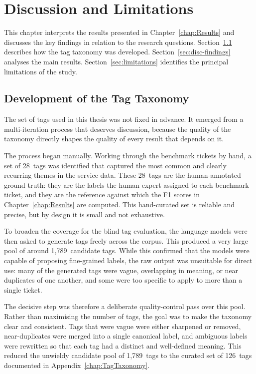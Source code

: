 \chapter{Discussion and Limitations}
%
\label{chap:Discussion}
%
This chapter interprets the results presented in Chapter~\ref{chap:Results}
and discusses the key findings in relation to the research questions.
Section~\ref{sec:disc-tags} describes how the tag taxonomy was developed.
Section~\ref{sec:disc-findings} analyses the main results.
Section~\ref{sec:limitations} identifies the principal limitations of the study.

\section{Development of the Tag Taxonomy}
\label{sec:disc-tags}
%
The set of tags used in this thesis was not fixed in advance.  It emerged from
a multi-iteration process that deserves discussion, because the quality of the
taxonomy directly shapes the quality of every result that depends on it.

The process began manually.  Working through the benchmark tickets by hand, a
set of 28~tags was identified that captured the most common and clearly
recurring themes in the service data.  These 28~tags are the human-annotated
ground truth: they are the labels the human expert assigned to each benchmark
ticket, and they are the reference against which the F1 scores in
Chapter~\ref{chap:Results} are computed.  This hand-curated set is reliable and
precise, but by design it is small and not exhaustive.

To broaden the coverage for the blind tag evaluation, the language models were
then asked to generate tags freely across the corpus.  This produced a very
large pool of around 1{,}789~candidate tags.  While this confirmed that the
models were capable of proposing fine-grained labels, the raw output was
unsuitable for direct use: many of the generated tags were vague, overlapping
in meaning, or near duplicates of one another, and some were too specific to
apply to more than a single ticket.

The decisive step was therefore a deliberate quality-control pass over this
pool.  Rather than maximising the number of tags, the goal was to make the
taxonomy clear and consistent.  Tags that were vague were either sharpened or
removed, near-duplicates were merged into a single canonical label, and
ambiguous labels were rewritten so that each tag had a distinct and
well-defined meaning.  This reduced the unwieldy candidate pool of 1{,}789~tags
to the curated set of 126~tags documented in Appendix~\ref{chap:TagTaxonomy}.

